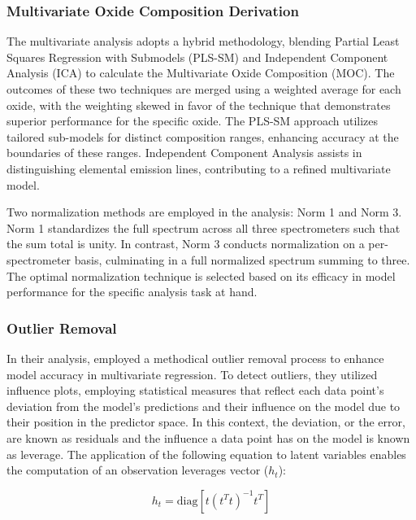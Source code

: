 \subsubsection{Multivariate Oxide Composition Derivation}\label{sec:moc_derivation}
The multivariate analysis adopts a hybrid methodology, blending Partial Least Squares Regression with Submodels (PLS-SM) and Independent Component Analysis (ICA) to calculate the Multivariate Oxide Composition (MOC).
The outcomes of these two techniques are merged using a weighted average for each oxide, with the weighting skewed in favor of the technique that demonstrates superior performance for the specific oxide.
The PLS-SM approach utilizes tailored sub-models for distinct composition ranges, enhancing accuracy at the boundaries of these ranges.
Independent Component Analysis assists in distinguishing elemental emission lines, contributing to a refined multivariate model.

Two normalization methods are employed in the analysis: Norm 1 and Norm 3.
Norm 1 standardizes the full spectrum across all three spectrometers such that the sum total is unity.
In contrast, Norm 3 conducts normalization on a per-spectrometer basis, culminating in a full normalized spectrum summing to three.
The optimal normalization technique is selected based on its efficacy in model performance for the specific analysis task at hand.

\subsubsection{Outlier Removal}\label{sec:outlier_removal}

In their analysis, \citet{andersonImprovedAccuracyQuantitative2017} employed a methodical outlier removal process to enhance model accuracy in multivariate regression. To detect outliers, they utilized influence plots, employing statistical measures that reflect each data point's deviation from the model's predictions and their influence on the model due to their position in the predictor space.
In this context, the deviation, or the error, are known as residuals and the influence a data point has on the model is known as leverage.
The application of the following equation to latent variables enables the computation of an observation leverages vector (\(h_t\)):

\begin{equation}
    h_t = \text{diag}\left[ t(t^T t)^{-1} t^T \right]
\end{equation}

